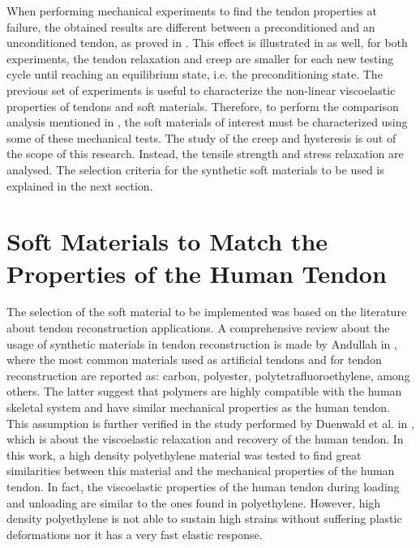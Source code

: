 When performing mechanical experiments to find the tendon properties at failure, the obtained results are different between a preconditioned and an unconditioned tendon, as proved in \cite{schatzmann1998effect}. This effect is illustrated in  as well, for both experiments, the tendon relaxation and creep are smaller for each new testing cycle until reaching an equilibrium state, i.e. the preconditioning state. The previous set of experiments is useful to characterize the non-linear viscoelastic properties of tendons and soft materials. Therefore, to perform the comparison analysis mentioned in , the soft materials of interest must be characterized using some of these mechanical tests. The study of the creep and hysteresis is out of the scope of this research. Instead, the tensile strength and stress relaxation are analysed. The selection criteria for the synthetic soft materials to be used is explained in the next section.

\section{Soft Materials to Match the Properties of the Human Tendon} \label{sec:softMaterials}

The selection of the soft material to be implemented was based on the literature about tendon reconstruction applications. A comprehensive review about the usage of synthetic materials in tendon reconstruction is made by Andullah in \cite{abdullah2015usage}, where the most common materials used as artificial tendons and for tendon reconstruction are reported as: carbon, polyester, polytetrafluoroethylene, among others. The latter suggest that polymers are highly compatible with the human skeletal system and have similar mechanical properties as the human tendon. This assumption is further verified in the study performed by Duenwald et al. in \cite{duenwald2009viscoelastic}, which is about the viscoelastic relaxation and recovery of the human tendon. In this work, a high density polyethylene material was tested to find great similarities between this material and the mechanical properties of the human tendon. In fact, the viscoelastic properties of the human tendon during loading and unloading are similar to the ones found in polyethylene. However, high density polyethylene is not able to sustain high strains without suffering plastic deformations nor it has a very fast elastic response.

